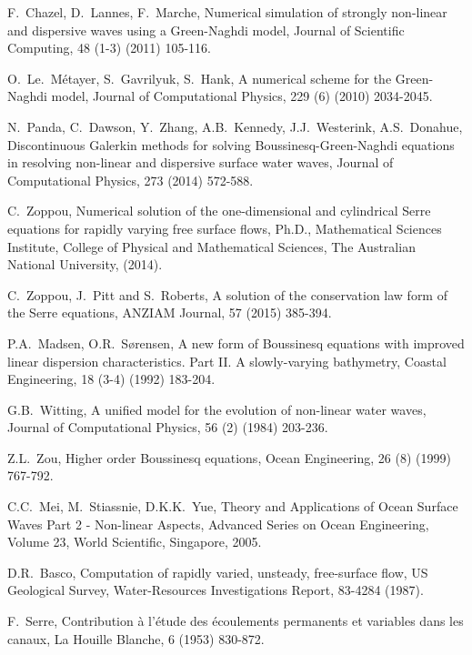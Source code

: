 \documentclass[preprint,sort&compress,1p]{article}
\begin{document}
\begin{thebibliography}{99}
 F.~Chazel, D.~Lannes, F.~Marche, Numerical simulation of strongly non-linear and dispersive waves using a Green-Naghdi model, Journal of Scientific Computing, 48 (1-3) (2011) 105-116.

 O.~Le.~M\'{e}tayer, S.~Gavrilyuk, S.~Hank, A numerical scheme for the Green-Naghdi model, Journal of Computational Physics, 229 (6) (2010) 2034-2045.

 N.~Panda, C.~Dawson, Y.~Zhang, A.B.~Kennedy, J.J.~Westerink, A.S.~Donahue, Discontinuous Galerkin methods for solving Boussinesq-Green-Naghdi equations in resolving non-linear and dispersive surface water waves, Journal of Computational Physics, 273 (2014) 572-588.

 C.~Zoppou, Numerical solution of the one-dimensional and cylindrical Serre equations for rapidly varying free surface flows, Ph.D., Mathematical Sciences Institute, College of Physical and Mathematical Sciences, The Australian National University, (2014).

 C.~Zoppou, J.~Pitt and S.~Roberts, A solution of the conservation law form of the Serre equations, ANZIAM Journal, 57 (2015) 385-394.

 P.A.~Madsen, O.R.~S{\o}rensen, A new form of Boussinesq equations with improved linear dispersion characteristics. Part II. A slowly-varying bathymetry, Coastal Engineering, 18 (3-4) (1992) 183-204.

 G.B.~Witting, A unified model for the evolution of non-linear water waves, Journal of Computational Physics, 56 (2) (1984) 203-236.

 Z.L.~Zou, Higher order Boussinesq equations, Ocean Engineering, 26 (8) (1999) 767-792.

 C.C.~Mei, M.~Stiassnie, D.K.K.~Yue, Theory and Applications of Ocean Surface Waves Part 2 - Non-linear Aspects, Advanced Series on Ocean Engineering, Volume 23, World Scientific, Singapore, 2005.

 D.R.~Basco, Computation of rapidly varied, unsteady, free-surface flow, US Geological Survey, Water-Resources Investigations Report, 83-4284 (1987).

 F.~Serre, Contribution \`{a} l'\'{e}tude des \'{e}coulements permanents et variables dans les canaux, La Houille Blanche, 6 (1953) 830-872.


\end{thebibliography}
\end{document}
